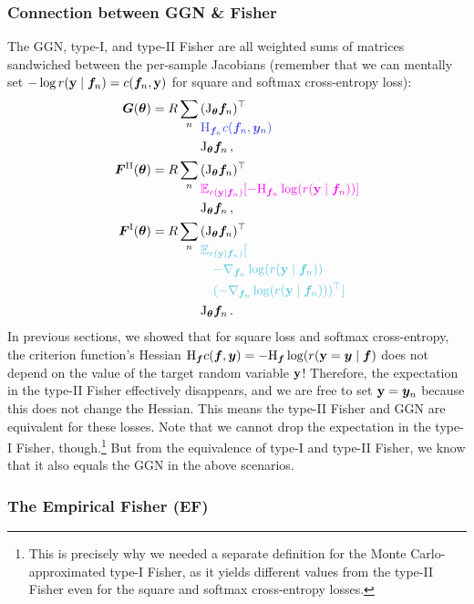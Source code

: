 \subsubsection{Connection between GGN \& Fisher}\label{subsec:connection-ggn-fisher}
The GGN, type-I, and type-II Fisher are all weighted sums of matrices sandwiched between the per-sample Jacobians (remember that we can mentally set $-\log r({\mathbf{y}} \mid {\bm{f}}_n) = c({\bm{f}}_n, {\mathbf{y}})$ for square and softmax cross-entropy loss):
\begin{align*}
  \mG(\vtheta)
  & =
    R \sum_n
    \begin{aligned}[t]
      & (\jac_{\vtheta}\vf_n)^\top                           \\
      & \textcolor{VectorBlue}{\hess_{\vf_n}c(\vf_n, \vy_n)} \\
      & \jac_{\vtheta}\vf_n\,,
    \end{aligned}
  \\
  \mF^{\text{II}}(\vtheta)
  & =
    R \sum_n
    \begin{aligned}[t]
      & (\jac_{\vtheta}\vf_n)^\top                                                                 \\
      & \textcolor{VectorPink}{\E_{r(\rvy \mid \vf_n)}[-\hess_{\vf_n} \log( r(\rvy \mid \vf_n)) ]} \\
      & \jac_{\vtheta}\vf_n\,,
    \end{aligned}
  \\
  \mF^{\text{I}}(\vtheta)
  & =
    R \sum_n
    \begin{aligned}[t]
      & (\jac_{\vtheta}\vf_n)^\top
      \\
      & \colored[VectorTeal]{\E_{r(\rvy \mid \vf_n)}[}
      \\
      &\begin{aligned}[t]
        &\quad \colored[VectorTeal]{-\nabla_{\vf_n} \log( r(\rvy \mid \vf_n))}
        \\
        &\quad \colored[VectorTeal]{(-\nabla_{\vf_n} \log( r(\rvy \mid \vf_n)))^{\top}]}
      \end{aligned}
      \\
      & \jac_{\vtheta}\vf_n\,.
    \end{aligned}
\end{align*}
In previous sections, we showed that for square loss and softmax cross-entropy, the criterion function's Hessian $\mathrm{H}_{\bm{f}} c({\bm{f}}, {\bm{y}}) = -\mathrm{H}_{{\bm{f}}} \log( r({\mathbf{y}} = {\bm{y}} \mid {\bm{f}})$ does not depend on the value of the target random variable ${\mathbf{y}}$!
Therefore, the expectation in the type-II Fisher effectively disappears, and we are free to set ${\mathbf{y}} = {\bm{y}}_n$ because this does not change the Hessian.
This means the type-II Fisher and GGN are equivalent for these losses.
Note that we cannot drop the expectation in the type-I Fisher, though.\footnote{This is precisely why we needed a separate definition for the Monte Carlo-approximated type-I Fisher,
  as it yields different values from the type-II Fisher even for the square and softmax cross-entropy losses.}
But from the equivalence of type-I and type-II Fisher, we know that it also equals the GGN in the above scenarios.

\subsubsection{The Empirical Fisher (EF)}\label{sec:emp_fisher}


